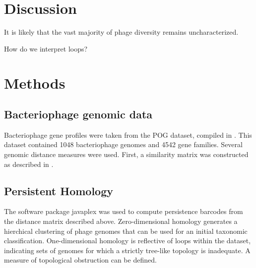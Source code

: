 \documentclass[12pt]{article}
\begin{document}
\subsection*{}

\section*{Discussion}
It is likely that the vast majority of phage diversity remains uncharacterized.

How do we interpret loops?

\section*{Methods}

\subsection*{Bacteriophage genomic data}
Bacteriophage gene profiles were taken from the POG dataset, compiled in \cite{Kristensen13}.
This dataset contained 1048 bacteriophage genomes and 4542 gene families.
Several genomic distance measures were used.
First, a similarity matrix was constructed as described in \cite{LimaMendez08}.

\subsection*{Persistent Homology}
The software package javaplex was used to compute persistence barcodes from the distance matrix described above.
Zero-dimensional homology generates a hierchical clustering of phage genomes that can be used for an initial taxonomic classification.
One-dimensional homology is reflective of loops within the dataset, indicating sets of genomes for which a strictly tree-like topology is inadequate.
A measure of topological obstruction can be defined.
\end{document}
